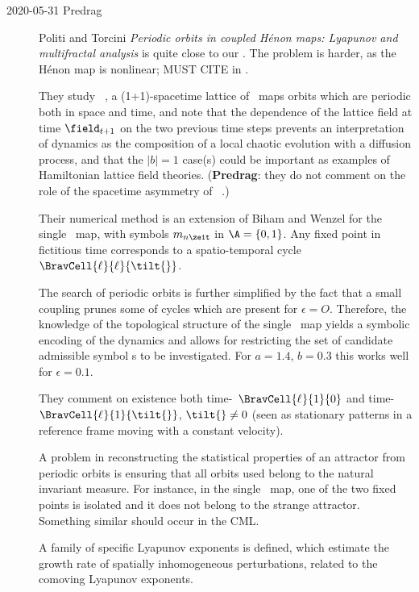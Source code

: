 \begin{description}

\item[2020-05-31 Predrag] Politi and Torcini {\em Periodic
orbits in coupled {H{\'e}non} maps: {Lyapunov} and multifractal analysis}
is quite close to our \catlatt. The problem is harder,
as the {H{\'e}non} map is nonlinear; MUST CITE in .

They study \emph{\spt\ \Henon}, a (1+1)-spacetime lattice of
\Henon\ maps orbits which are periodic both in space and time, and note
that the dependence of the lattice field at time $\field_{t + 1}$ on the
two previous time steps prevents an interpretation of dynamics as
the composition of a local chaotic evolution with a diffusion process,
and that the $|b|=1$ case(s) could be important as examples of Hamiltonian
lattice field theories. (\textbf{Predrag}: they do not comment on
the role of the spacetime asymmetry of \spt\ \Henon.)

Their numerical method is an extension of Biham and Wenzel for
the single \Henon\ map, with symbols $\Ssym{n\zeit}$ in $\A=\{0,1\}$. Any
fixed point in fictitious time corresponds to a spatio-temporal cycle
$\BravCell{\speriod{}}{\period{}}{\tilt{}}$.

The search of periodic orbits is further simplified by the fact that a
small coupling prunes some of cycles which are present for $\epsilon=O$.
Therefore, the knowledge of the topological structure of the single
\Henon\ map yields a symbolic encoding of the dynamics and allows for
restricting the set of candidate admissible symbol {\brick}s to be
investigated. For $a=1.4$, $b=0.3$ this works well for $\epsilon=0.1$.

They comment on existence both time-\eqva\ $\BravCell{\speriod{}}{1}{0}$
and time-\reqva\ $\BravCell{\speriod{}}{1}{\tilt{}}$,  $\tilt{}\neq0$
(seen as stationary patterns in a reference frame moving with a constant
velocity).

A problem in reconstructing the statistical properties of an attractor
from periodic orbits is ensuring that all orbits used belong to the
natural invariant measure. For instance, in the single \Henon\ map, one
of the two fixed points is isolated and it does not belong to the strange
attractor. Something similar should occur in the CML.

A family of specific Lyapunov exponents is defined, which estimate the
 growth rate of spatially inhomogeneous perturbations,
related to the comoving Lyapunov exponents.


\end{description}
